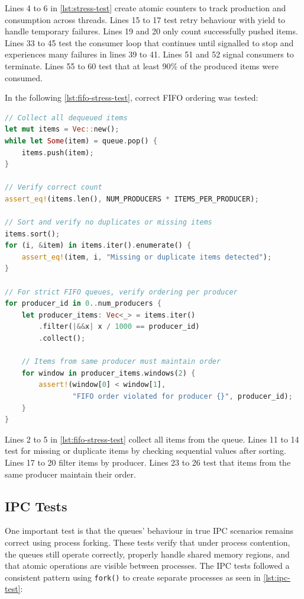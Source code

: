 Lines 4 to 6 in \cref{lst:stress-test} create atomic counters to track production and consumption across threads. Lines 15 to 17 test retry behaviour with yield to handle temporary failures. Lines 19 and 20 only count successfully pushed items. Lines 33 to 45 test the consumer loop that continues until signalled to stop and experiences many failures in lines 39 to 41. Lines 51 and 52 signal consumers to terminate. Lines 55 to 60 test that at least 90\% of the produced items were consumed.

In the following \cref{lst:fifo-stress-test}, correct \ac{FIFO} ordering was tested:

\begin{lstlisting}[language=Rust, style=boxed, caption={FIFO ordering verification under stress}, label={lst:fifo-stress-test}]
// Collect all dequeued items
let mut items = Vec::new();
while let Some(item) = queue.pop() {
    items.push(item);
}

// Verify correct count
assert_eq!(items.len(), NUM_PRODUCERS * ITEMS_PER_PRODUCER);

// Sort and verify no duplicates or missing items
items.sort();
for (i, &item) in items.iter().enumerate() {
    assert_eq!(item, i, "Missing or duplicate items detected");
}

// For strict FIFO queues, verify ordering per producer
for producer_id in 0..num_producers {
    let producer_items: Vec<_> = items.iter()
        .filter(|&&x| x / 1000 == producer_id)
        .collect();
    
    // Items from same producer must maintain order
    for window in producer_items.windows(2) {
        assert!(window[0] < window[1], 
                "FIFO order violated for producer {}", producer_id);
    }
}
\end{lstlisting}

Lines 2 to 5 in \cref{lst:fifo-stress-test} collect all items from the queue. Lines 11 to 14 test for missing or duplicate items by checking sequential values after sorting. Lines 17 to 20 filter items by producer. Lines 23 to 26 test that items from the same producer maintain their order.

\subsection{\acf{IPC} Tests}
One important test is that the queues' behaviour in true \ac{IPC} scenarios remains correct using process forking. These tests verify that under process contention, the queues still operate correctly, properly handle shared memory regions, and that atomic operations are visible between processes. The \ac{IPC} tests followed a consistent pattern using \texttt{fork()} to create separate processes as seen in \cref{lst:ipc-test}:

